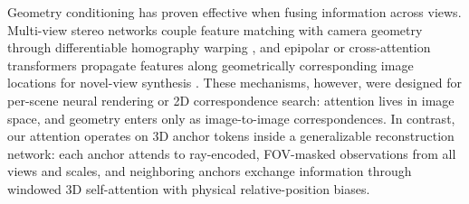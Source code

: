 Geometry conditioning has proven effective when fusing information across
views. Multi-view stereo networks couple feature matching with camera
geometry through differentiable homography warping \cite{yao2018mvsnet}, and
epipolar or cross-attention transformers propagate features along
geometrically corresponding image locations for novel-view synthesis
\cite{ravi2020epipolar,yu2021pixelnerf,wang2021ibrnet}. These mechanisms,
however, were designed for per-scene neural rendering or 2D correspondence
search: attention lives in image space, and geometry enters only as
image-to-image correspondences. In contrast, our attention operates on 3D
anchor tokens inside a generalizable reconstruction network: each anchor
attends to ray-encoded, FOV-masked observations from all views and scales,
and neighboring anchors exchange information through windowed 3D
self-attention with physical relative-position biases.

%
